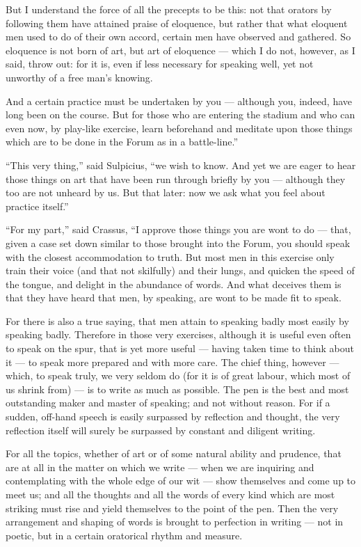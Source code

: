  But I understand the force of all the precepts to be this: not that orators by following them have attained praise of eloquence, but rather that what eloquent men used to do of their own accord, certain men have observed and gathered. So eloquence is not born of art, but art of eloquence — which I do not, however, as I said, throw out: for it is, even if less necessary for speaking well, yet not unworthy of a free man's knowing.

 And a certain practice must be undertaken by you — although you, indeed, have long been on the course. But for those who are entering the stadium and who can even now, by play-like exercise, learn beforehand and meditate upon those things which are to be done in the Forum as in a battle-line.''

 ``This very thing,'' said Sulpicius, ``we wish to know. And yet we are eager to hear those things on art that have been run through briefly by you — although they too are not unheard by us. But that later: now we ask what you feel about practice itself.''

 ``For my part,'' said Crassus, ``I approve those things you are wont to do — that, given a case set down similar to those brought into the Forum, you should speak with the closest accommodation to truth. But most men in this exercise only train their voice (and that not skilfully) and their lungs, and quicken the speed of the tongue, and delight in the abundance of words. And what deceives them is that they have heard that men, by speaking, are wont to be made fit to speak.

 For there is also a true saying, that men attain to speaking badly most easily by speaking badly. Therefore in those very exercises, although it is useful even often to speak on the spur, that is yet more useful — having taken time to think about it — to speak more prepared and with more care. The chief thing, however — which, to speak truly, we very seldom do (for it is of great labour, which most of us shrink from) — is to write as much as possible. The pen is the best and most outstanding maker and master of speaking; and not without reason. For if a sudden, off-hand speech is easily surpassed by reflection and thought, the very reflection itself will surely be surpassed by constant and diligent writing.

 For all the topics, whether of art or of some natural ability and prudence, that are at all in the matter on which we write — when we are inquiring and contemplating with the whole edge of our wit — show themselves and come up to meet us; and all the thoughts and all the words of every kind which are most striking must rise and yield themselves to the point of the pen. Then the very arrangement and shaping of words is brought to perfection in writing — not in poetic, but in a certain oratorical rhythm and measure.

